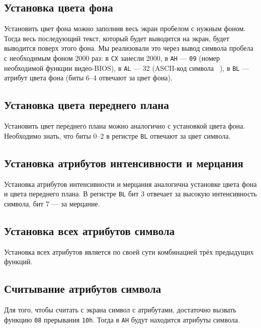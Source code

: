 \documentclass[a4paper,12pt,notitlepage,pdftex,headsepline]{scrartcl}
\begin{document}
\subsection{Установка цвета фона}
Установить цвет фона можно заполнив весь экран пробелом с нужным фоном.
Тогда весь последующий текст, который будет выводится на экран, будет выводится поверх этого фона.
Мы реализовали это через вывод символа пробела с необходимым фоном 2000 раз:
в \texttt{CX} занесли 2000, в \texttt{AH} --- \texttt{09} (номер необходимой функции видео-BIOS), в \texttt{AL} --- 32 (ASCII-код символа \verb*' '), в \texttt{BL} --- атрибут цвета фона (биты 6--4 отвечают за цвет фона).
\subsection{Установка цвета переднего плана}
Установить цвет переднего плана можно аналогично с установкой цвета фона.
Необходимо знать, что биты 0--2 в регистре \texttt{BL} отвечают за цвет символа.
\subsection{Установка атрибутов интенсивности и мерцания}
Установка атрибутов интенсивности и мерцания аналогична установке цвета фона и цвета переднего плана.
В регистре \texttt{BL} бит 3 отвечает за высокую интенсивность символа, бит 7 --- за мерцание.
\subsection{Установка всех атрибутов символа}
Установка всех атрибутов является по своей сути комбинацией трёх предыдущих функций.
\subsection{Считывание атрибутов символа}
Для того, чтобы считать с экрана символ с атрибутами, достаточно вызвать функцию \texttt{08} прерывания \texttt{10h}.
Тогда в \texttt{AH} будут находится атрибуты символа.
\newpage
\end{document}
